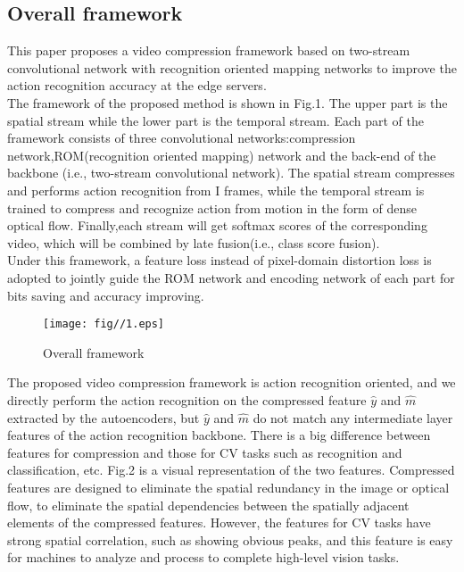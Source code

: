 \documentclass[a4paper]{cas-sc}
\begin{document}
\subsection{Overall framework}
This paper proposes a video compression framework based on two-stream convolutional network 
with recognition oriented mapping networks to improve the action recognition accuracy at the edge servers.\\

The framework of the proposed method is shown in Fig.1. 
The upper part is the spatial stream while the lower part is the temporal stream.
Each part of the framework consists of three convolutional networks:compression network,ROM(recognition oriented mapping) network and the back-end of the backbone
(i.e., two-stream convolutional network). 
The spatial stream compresses and performs action recognition from I frames, 
while the temporal stream is trained to compress and recognize action from motion in the form of dense
optical flow. 
Finally,each stream will get softmax scores of the corresponding video, which will be combined by late fusion(i.e., class score fusion).\\
Under this framework, a feature loss instead of pixel-domain distortion loss is adopted to jointly guide the ROM network
and encoding network of each part for bits saving and accuracy improving.

\begin{figure}[ht]
	\centering
		\texttt{[image: fig//1.eps]}
	  \caption{Overall framework}\label{fig.1}
\end{figure}

The proposed video compression framework is action recognition oriented,
and we directly perform the action recognition on the compressed feature $\hat{y}$ and $\hat{m}$ extracted by the autoencoders,
but $\hat{y}$ and $\hat{m}$ do not match any intermediate layer features of the action recognition backbone. 
There is a big difference between features for compression 
and those for CV tasks such as recognition and classification, etc. 
Fig.2 is a visual representation of the two features. 
Compressed features are designed to eliminate the spatial redundancy in the image or optical flow,
to eliminate the spatial dependencies between the spatially adjacent elements of the compressed features.
However, the features for CV tasks have strong spatial correlation, such as showing obvious peaks,
and this feature is easy for machines to analyze and process to complete high-level vision tasks.\\
\end{document}
